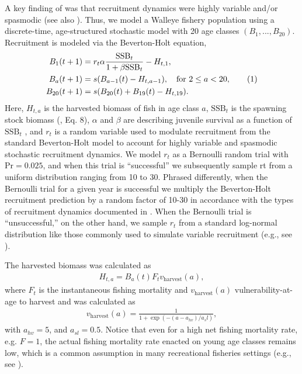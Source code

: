 \documentclass[floatfix,nofootinbib,longbibliography,notitlepage]{revtex4-1}
\newcommand\numberthis{\addtocounter{equation}{1}\tag{\theequation}}
\def\vharv{v_{\text{harvest}}}
\def\ssb{\text{SSB}}
\begin{document}
A key finding of \cite{cahill2022} was that recruitment dynamics were highly variable and/or spasmodic (see also \cite{caddy-gulland}). 
Thus, we model a Walleye fishery population using a discrete-time, age-structured stochastic model with 20 age classes $(B_1, ... ,B_{20})$. 
Recruitment is modeled via the Beverton-Holt equation,
\begin{align*}
    B_1(t+1) &= r_t \alpha \frac{\ssb_t}{1 + \beta \ssb_t} - H_{t,1},\\
    B_a(t+1) &= s (B_{a-1}(t) - H_{t,a-1}), \quad \text{for } 2 \leq a < 20, \numberthis\\
    B_{20}(t+1) &= s (B_{20}(t) + B_{19}(t) - H_{t,19}).
\end{align*}
Here, $H_{t,a}$ is the harvested biomass of fish in age class $a$, $\ssb_t$ is the spawning stock biomass (\cite{cahill2022}, Eq. 8), $\alpha$ and $\beta$ are describing juvenile survival as a function of $\ssb_t$ , and $r_t$ is a random variable used to modulate recruitment from the standard Beverton-Holt model to account for highly variable and spasmodic stochastic recruitment dynamics. 
We model $r_t$ as a Bernoulli random trial with $\text{Pr}=0.025$, and when this trial is “successful” we subsequently sample rt from a uniform distribution ranging from 10 to 30. 
Phrased differently, when the Bernoulli trial for a given year is successful we multiply the Beverton-Holt recruitment prediction by a random factor of 10-30 in accordance with the types of recruitment dynamics documented in \cite{cahill2022}. 
When the Bernoulli trial is “unsuccessful,” on the other hand, we sample $r_t$ from a standard log-normal distribution like those commonly used to simulate variable recruitment (e.g., see \cite{quinn-deriso}).

The harvested biomass was calculated as
\begin{align*}
    H_{t,a} = B_a(t) F_t \vharv(a),
\end{align*}
where $F_t$ is the instantaneous  fishing mortality and $\vharv(a)$ vulnerability-at-age to harvest and was calculated as
\begin{align}
    \vharv(a) = \frac1{1 + \exp(-(a-a_{hv})/a_sl)},
\end{align}
with $a_{hv}=5$, and $a_{sl}=0.5$. 
Notice that even for a high net fishing mortality rate, e.g. $F=1$, the actual fishing mortality rate enacted on young age classes remains low, which is a common assumption in many recreational fisheries settings (e.g., see \cite{golden2022focusing}).
\end{document}
